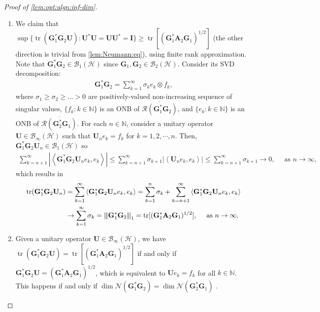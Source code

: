 \documentclass[noinfoline]{imsart}\setcounter{tocdepth}{2}
\renewcommand{\b}[1]{\mathbb{#1}} %
\newcommand{\m}[1]{\mathbf{#1}} %
\renewcommand{\c}[1]{\mathcal{#1}} %
\newcommand{\innpr}[2]{{\left\langle {#1},{#2}\right\rangle}} %
\DeclareMathOperator*{\tr}{tr}
\newcommand{\vertii}[1]{{\vert\kern-0.25ex\vert\kern-0.25ex\vert #1 
    \vert\kern-0.25ex\vert\kern-0.25ex\vert}} %
\theoremstyle{plain}
\begin{document}
\begin{proof}[Proof of \cref{lem:opt:algn:inf-dim}]
\begin{enumerate}[leftmargin=*]
\item [(Step 2)] We claim that $\sup \{\tr (\m{G}_{1}^{*} \m{G}_{2} \m{U}) : \m{U}^{*} \m{U} = \m{U} \m{U}^{*} = \m{I} \} \ge \tr [(\m{G}_{1}^{*} \m{A}_{2} \m{G}_{1})^{1/2}]$ (the other direction is trivial from \cref{lem:Neumann:eq}), using finite rank approximation. Note that $\m{G}_{1}^{*} \m{G}_{2} \in \c{B}_{1}(\c{H})$ since $\m{G}_{1}, \m{G}_{2} \in \c{B}_{2}(\c{H})$. Consider its SVD decomposition:
\begin{align*}
    \m{G}_{1}^{*} \m{G}_{2} = \sum_{k=1}^{\infty} \sigma_{k} e_{k} \otimes f_{k},
\end{align*}
where $\sigma_{1} \ge \sigma_{2} \ge \dots >0$ are positively-valued non-increasing sequence of singular values, $\{f_{k} : k \in \b{N}\}$ is an ONB of $\overline{\c{R}(\m{G}_{1}^{*} \m{G}_{2})}$, and $\{e_{k} : k \in \b{N}\}$ is an ONB of $\overline{\c{R}(\m{G}_{2}^{*} \m{G}_{1})}$. For each $n \in \b{N}$, consider a unitary operator $\m{U} \in \c{B}_{\infty}(\c{H})$ such that $\m{U}_{n} e_{k} = f_{k}$ for $k = 1, 2, \cdots, n$. Then, $\m{G}_{1}^{*} \m{G}_{2} \m{U}_{n} \in \c{B}_{1}(\c{H})$ so
\begin{align*}
    \sum_{k=n+1}^{\infty} |\innpr{\m{G}_{1}^{*} \m{G}_{2} \m{U}_{n} e_{k}}{e_{k}}| \le \sum_{k=n+1}^{\infty} \sigma_{k+1} |\innpr{\m{U}_{n} e_{k}}{e_{k}}| \le \sum_{k=n+1}^{\infty} \sigma_{k+1} \to 0, \quad \text{ as } n \to \infty,
\end{align*}
which results in
\begin{align*}
    \tr (\m{G}_{1}^{*} \m{G}_{2} \m{U}_{n}) &= \sum_{k=1}^{\infty} \innpr{\m{G}_{1}^{*} \m{G}_{2} \m{U}_{n} e_{k}}{e_{k}} = \sum_{k=1}^{n} \sigma_{k} + \sum_{k=n+1}^{\infty} \innpr{\m{G}_{1}^{*} \m{G}_{2} \m{U}_{n} e_{k}}{e_{k}} \\
    &\to \sum_{k=1}^{\infty} \sigma_{k} = \vertii{\m{G}_{1}^{*} \m{G}_{2}}_{1} = \tr [(\m{G}_{1}^{*} \m{A}_{2} \m{G}_{1})^{1/2}], \quad \text{ as } n \to \infty.
\end{align*}

\item [(Step 3)] Given a unitary operator $\m{U} \in \c{B}_{\infty}(\c{H})$, we have $\tr (\m{G}_{1}^{*} \m{G}_{2} \m{U}) = \tr [(\m{G}_{1}^{*} \m{A}_{2} \m{G}_{1})^{1/2}]$ if and only if $\m{G}_{1}^{*} \m{G}_{2} \m{U} = (\m{G}_{1}^{*} \m{A}_{2} \m{G}_{1})^{1/2}$, which is equivalent to $\m{U} e_{k} = f_{k}$ for all $k \in \b{N}$. This happens if and only if $\dim \c{N}(\m{G}_{1}^{*} \m{G}_{2}) = \dim \c{N}(\m{G}_{2}^{*} \m{G}_{1})$ \cite{conway2019course}.
\end{enumerate}
\end{proof}
\end{document}

